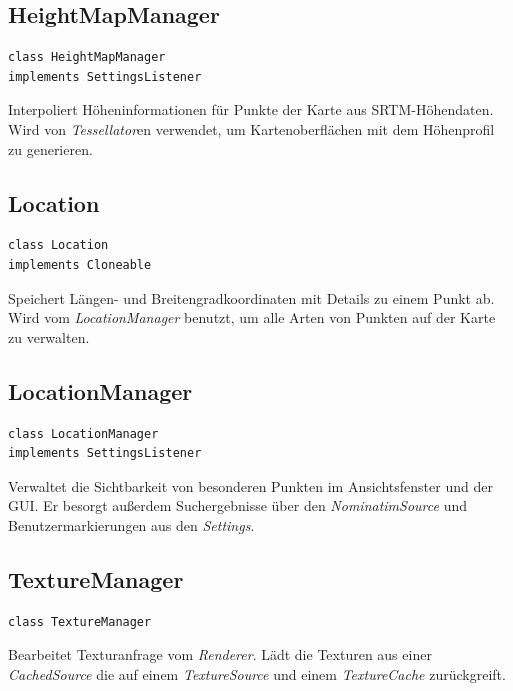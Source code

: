 \documentclass[10pt]{scrreprt}
\begin{document}
\subsection*{HeightMapManager}
\begin{lstlisting}
class HeightMapManager
implements SettingsListener
\end{lstlisting}
Interpoliert Höheninformationen für Punkte der Karte aus SRTM-Höhendaten. Wird von \textit{Tessellator}en verwendet, um Kartenoberflächen mit dem Höhenprofil zu generieren.\\

\vspace{5mm}
\subsection*{Location}
\begin{lstlisting}
class Location
implements Cloneable
\end{lstlisting}
Speichert Längen- und Breitengradkoordinaten mit Details zu einem Punkt ab. Wird vom \textit{LocationManager} benutzt, um alle Arten von Punkten auf der Karte zu verwalten.\\

\vspace{5mm}
\subsection*{LocationManager}
\begin{lstlisting}
class LocationManager
implements SettingsListener
\end{lstlisting}
Verwaltet die Sichtbarkeit von besonderen Punkten im Ansichtsfenster und der GUI. Er besorgt außerdem Suchergebnisse über den \textit{NominatimSource} und Benutzermarkierungen aus den \textit{Settings}.\\

\vspace{5mm}
\subsection*{TextureManager}
\begin{lstlisting}
class TextureManager
\end{lstlisting}
Bearbeitet Texturanfrage vom \textit{Renderer}. Lädt die Texturen aus einer \textit{CachedSource} die auf einem \textit{TextureSource} und einem \textit{TextureCache} zurückgreift.\\
\end{document}
